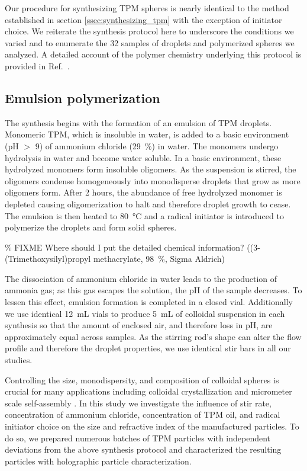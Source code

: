 Our procedure for synthesizing TPM spheres is nearly identical to the
method established in section \ref{ssec:synthesizing_tpm} with the
exception of initiator choice. We reiterate the synthesis protocol
here to underscore the conditions we varied and to enumerate the
\num{32} samples of droplets and polymerized spheres we analyzed.
A detailed account of the polymer chemistry underlying this
protocol is provided in Ref.~\cite{vanderwel17}.

\subsection{Emulsion polymerization}

The synthesis begins with the formation of an emulsion of TPM droplets.
Monomeric TPM, which is insoluble in water, is added to a basic environment
(pH $>$ \num{9}) of ammonium chloride (\SI{29}{\percent}) in water.
The monomers undergo hydrolysis in water and become water soluble. 
In a basic environment, these hydrolyzed monomers form insoluble 
oligomers. As the suspension is stirred, the oligomers condense 
homogeneously into monodisperse droplets that grow as more oligomers form.
After \num{2} hours, the abundance of free hydrolyzed monomer is depleted
causing oligomerization to halt and therefore droplet growth to cease.
The emulsion is then heated to \SI{80}{\degreeCelsius} and a radical 
initiator is introduced to polymerize the droplets and form solid spheres.

\% FIXME Where should I put the detailed chemical information?
((3-(Trimethoxysilyl)propyl methacrylate, \SI{98}{\percent}, Sigma Aldrich)

The dissociation of ammonium chloride in water leads to the production of ammonia
gas; as this gas escapes the solution, the pH of the sample decreases.
To lessen this effect, emulsion formation is completed in a closed vial.
Additionally we use identical \SI{12}{\milli\liter} vials to produce \SI{5}{\milli\liter}
of colloidal suspension in each synthesis so that the amount of enclosed air, and therefore
loss in pH, are approximately equal across samples. As the stirring rod's shape can alter the
flow profile and therefore the droplet properties, we use identical stir bars in all our
studies.

Controlling the size, monodispersity, and composition of colloidal spheres is crucial
for many applications including colloidal crystallization \cite{pusey87} and micrometer scale
self-assembly \cite{sacanna11}. In this study 
we investigate the influence of stir rate, concentration of ammonium chloride,
concentration of TPM oil, and radical initiator choice on the size and refractive index
of the manufactured particles. To do so, we prepared numerous batches of TPM particles
with independent deviations from the above synthesis protocol and
characterized the resulting particles with holographic particle characterization.

